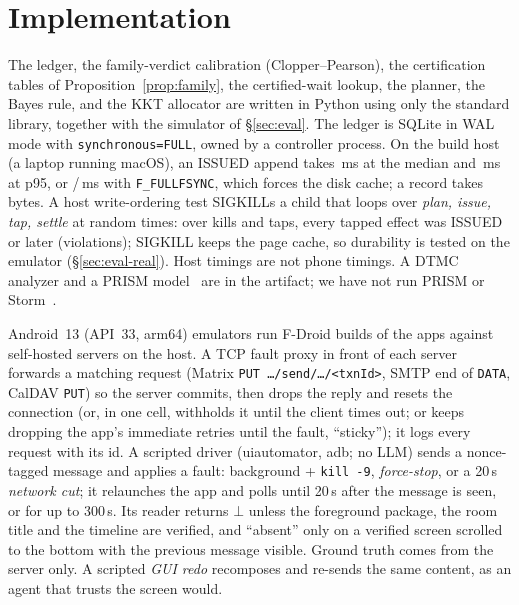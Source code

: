 \section{Implementation}
\label{sec:impl}

 The ledger, the family-verdict calibration (Clopper--Pearson), the certification tables of Proposition~\ref{prop:family}, the certified-wait lookup,
the planner, the Bayes rule, and the KKT allocator are written in Python using only the standard library, together with the simulator of \S\ref{sec:eval}. The ledger is SQLite
in WAL mode with \texttt{synchronous=FULL}, owned by a controller process. On the build host (a laptop running macOS), an \textsf{ISSUED} append takes \LedgerPfifty\,ms at the median
and \LedgerPninetyfive\,ms at p95, or \LedgerFullPfifty/\LedgerFullPninetyfive\,ms with \texttt{F\_FULLFSYNC}, which forces the disk cache; a record takes \LedgerBytes\,bytes.
A host write-ordering test SIGKILLs a child that loops over \emph{plan, issue, tap, settle} at random times: over \LedgerTrials kills and \LedgerTaps taps, every tapped effect
was \textsf{ISSUED} or later (\LedgerViol violations); SIGKILL keeps the page cache, so durability is tested on the emulator (\S\ref{sec:eval-real}). Host timings are not phone
timings. A DTMC analyzer and a PRISM model~\cite{kwiatkowska2011prism} are in the artifact; we have not run PRISM or Storm~\cite{hensel2022storm}.

 Android~13 (API~33, arm64) emulators run F-Droid builds of the apps against self-hosted servers on the host. A TCP fault proxy in front of
each server forwards a matching request (Matrix \texttt{PUT \dots/send/\dots/<txnId>}, SMTP end of \texttt{DATA}, CalDAV \texttt{PUT}) so the server commits, then drops the reply
and resets the connection (or, in one cell, withholds it until the client times out; or keeps dropping the app's immediate retries until the fault, ``sticky''); it logs every
request with its id. A scripted driver (uiautomator, adb; no LLM) sends a nonce-tagged message and applies a fault: background + \texttt{kill -9}, \emph{force-stop}, or a
20\,s \emph{network cut}; it relaunches the app and polls until 20\,s after the message is seen, or for up to 300\,s. Its reader returns $\bot$ unless the foreground package,
the room title and the timeline are verified, and ``absent'' only on a verified screen scrolled to the bottom with the previous message visible. Ground truth comes from the
server only. A scripted \emph{GUI redo} recomposes and re-sends the same content, as an agent that trusts the screen would.

